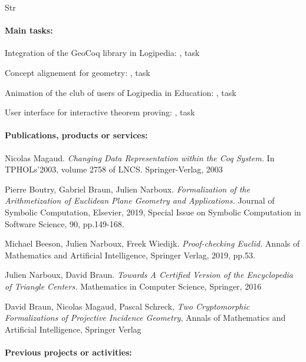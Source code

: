 \begin{sitedescription}{Str}
\paragraph*{Main tasks:}

\begin{compactitem}
\item Integration of the GeoCoq library in Logipedia: , task 
\item Concept alignement for geometry: , task 
\item Animation of the club of users of Logipedia in Education: , task  
\item User interface for interactive theorem proving: , task 
\end{compactitem}

\paragraph*{Publications, products or services:}

\begin{compactitem}
\item Nicolas Magaud. \emph{Changing Data Representation within the Coq System.} In TPHOLs'2003, volume 2758 of LNCS. Springer-Verlag, 2003
\item Pierre Boutry, Gabriel Braun, Julien Narboux. \emph{Formalization of the Arithmetization of Euclidean Plane Geometry and Applications.} Journal of Symbolic Computation, Elsevier, 2019, Special Issue on Symbolic Computation in Software Science, 90, pp.149-168.
\item Michael Beeson, Julien Narboux, Freek Wiedijk. \emph{Proof-checking Euclid.} Annals of Mathematics and Artificial Intelligence, Springer Verlag, 2019, pp.53.
\item Julien Narboux, David Braun. \emph{Towards A Certified Version of the Encyclopedia of Triangle Centers.} Mathematics in Computer Science, Springer, 2016
\item David Braun, Nicolas Magaud, Pascal Schreck, \emph{Two Cryptomorphic Formalizations of Projective Incidence Geometry}, Annals of Mathematics and Artificial Intelligence, Springer Verlag
\end{compactitem}

\paragraph*{Previous projects or activities:}


\end{sitedescription}
